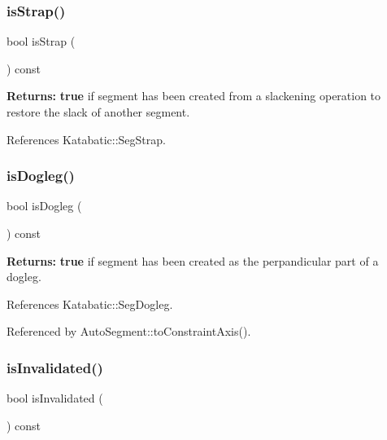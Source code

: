\subsubsection{\texorpdfstring{is\+Strap()}{isStrap()}}
{\footnotesize\ttfamily bool is\+Strap (\begin{DoxyParamCaption}{ }\end{DoxyParamCaption}) const\hspace{0.3cm}{\ttfamily [inline]}}

{\bfseries Returns\+:} {\bfseries true} if segment has been created from a slackening operation to restore the slack of another segment. 

References Katabatic\+::\+Seg\+Strap.

\mbox{\label{classKatabatic_1_1AutoSegment_a75d91371e5281dd21f60ff39ae70a3e5}} 
\subsubsection{\texorpdfstring{is\+Dogleg()}{isDogleg()}}
{\footnotesize\ttfamily bool is\+Dogleg (\begin{DoxyParamCaption}{ }\end{DoxyParamCaption}) const\hspace{0.3cm}{\ttfamily [inline]}}

{\bfseries Returns\+:} {\bfseries true} if segment has been created as the perpandicular part of a dogleg. 

References Katabatic\+::\+Seg\+Dogleg.



Referenced by Auto\+Segment\+::to\+Constraint\+Axis().

\mbox{\label{classKatabatic_1_1AutoSegment_ac540608485240ff88970131ebc02c1ab}} 
\subsubsection{\texorpdfstring{is\+Invalidated()}{isInvalidated()}}
{\footnotesize\ttfamily bool is\+Invalidated (\begin{DoxyParamCaption}{ }\end{DoxyParamCaption}) const\hspace{0.3cm}{\ttfamily [inline]}}

